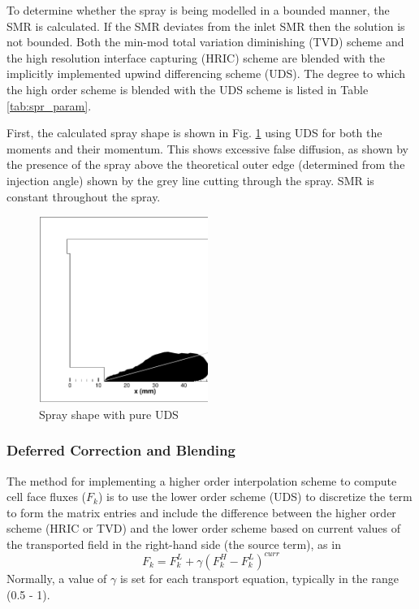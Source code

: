 \documentclass[a4paper,10pt]{article}
\begin{document}
To determine whether the spray is being modelled in a bounded manner, the SMR is calculated. If the SMR deviates from the inlet SMR then the solution is not bounded. Both the min-mod total variation diminishing (TVD) scheme and the high resolution interface capturing (HRIC) scheme \cite{muzaferija1999} are blended with the implicitly implemented upwind differencing scheme (UDS). The degree to which the high order scheme is blended with the UDS scheme is listed in Table \ref{tab:spr_param}.

First, the calculated spray shape is shown in Fig. \ref{fig:uds} using UDS for both the moments and their momentum. This shows excessive false diffusion, as shown by the presence of the spray above the theoretical outer edge (determined from the injection angle) shown by the grey line cutting through the spray. SMR is constant throughout the spray.
\begin{figure}[H]
\centering
\includegraphics[width=0.49\textwidth]{pc_101.eps}
\caption{Spray shape with pure UDS}
\label{fig:uds}
\end{figure}

\subsubsection{Deferred Correction and Blending}
The method for implementing a higher order interpolation scheme to compute cell face fluxes ($F_k$) is to use the lower order scheme (UDS) to discretize the term to form the matrix entries and include the difference between the higher order scheme (HRIC or TVD) and the lower order scheme based on current values of the transported field in the right-hand side (the source term), as in
\begin{equation} \label{eqn:def_conv}
F_k = F_k^L + \gamma (F_k^H - F_k^L)^{curr}
\end{equation}
Normally, a value of $\gamma$ is set for each transport equation, typically in the range (0.5 - 1).
\end{document}

